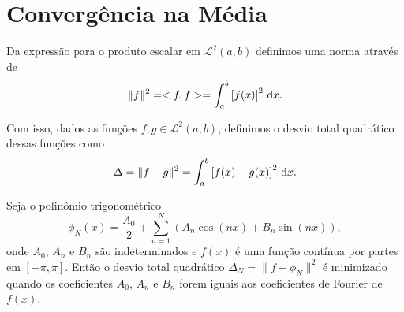 \section{Convergência na Média}
Da expressão para o produto escalar em $\mathcal{L}^2(a, b)$ definimos uma norma
através de
\begin{dmath*}
  \| f \|^2 = <f, f> = \int_a^b \left[ f(x) \right]^2 \vi{x}.
\end{dmath*}

Com isso, dados as funções $f, g \in \mathcal{L}^2(a, b)$, definimos o desvio
total quadrático dessas funções como
\begin{dmath*}
  \Delta = \| f - g \|^2 = \int_a^b \left[ f(x) - g(x) \right]^2 \vi{x}.
\end{dmath*}

\begin{teo} \label{teo:min_desvio_total_quad}
  Seja o polinômio trigonométrico
  \begin{dmath*}
    \phi_N(x) = \frac{A_0}{2} + \sum_{n = 1}^N \left( A_n \cos\left( n x
    \right) + B_n \sin\left( n x \right) \right),
  \end{dmath*}
  onde $A_0$, $A_n$ e $B_n$ são indeterminados e $f(x)$ é uma função contínua
  por partes em $[-\pi, \pi]$. Então o desvio total quadrático $\Delta_N = \| f
  - \phi_N \|^2$ é minimizado quando os coeficientes $A_0$, $A_n$ e $B_n$ forem
  iguais aos coeficientes de Fourier de $f(x)$.
\end{teo}
